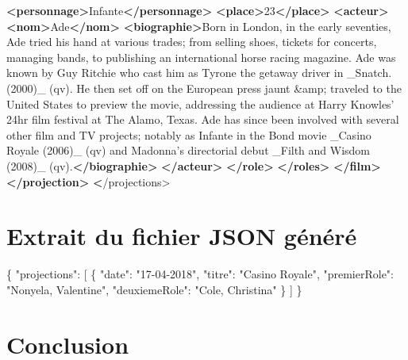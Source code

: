 \documentclass[]{article}
\newenvironment{Shaded}{}{}
\newcommand{\KeywordTok}[1]{\textcolor[rgb]{0.00,0.44,0.13}{\textbf{{#1}}}}
\newcommand{\DataTypeTok}[1]{\textcolor[rgb]{0.56,0.13,0.00}{{#1}}}
\newcommand{\DecValTok}[1]{\textcolor[rgb]{0.25,0.63,0.44}{{#1}}}
\newcommand{\StringTok}[1]{\textcolor[rgb]{0.25,0.44,0.63}{{#1}}}
\newcommand{\OtherTok}[1]{\textcolor[rgb]{0.00,0.44,0.13}{{#1}}}
\newcommand{\FunctionTok}[1]{\textcolor[rgb]{0.02,0.16,0.49}{{#1}}}
\newcommand{\ErrorTok}[1]{\textcolor[rgb]{1.00,0.00,0.00}{\textbf{{#1}}}}
\newcommand{\NormalTok}[1]{{#1}}
\begin{document}
\begin{Shaded}
\begin{Highlighting}[]
          \KeywordTok{<personnage>}\NormalTok{Infante}\KeywordTok{</personnage>}
          \KeywordTok{<place>}\NormalTok{23}\KeywordTok{</place>}
          \KeywordTok{<acteur>}
            \KeywordTok{<nom>}\NormalTok{Ade}\KeywordTok{</nom>}
            \KeywordTok{<biographie>}\NormalTok{Born in London, in the early seventies, Ade tried his hand at various trades;}
            {from selling shoes, tickets for concerts, managing bands, to publishing an}
            {international horse racing magazine. Ade was known by Guy Ritchie who cast him as}
            {Tyrone the getaway driver in _Snatch. (2000)_ (qv). He then set off on the European}
            {press jaunt }\DecValTok{&amp;} \NormalTok{traveled to the United States to preview}
            {the movie, addressing the audience at Harry Knowles' 24hr film festival at The Alamo,}
            {Texas.  Ade has since been involved with several other film and TV projects; notably}
            {as Infante in the Bond movie _Casino Royale (2006)_ (qv) and Madonna's directorial}
            {debut _Filth and Wisdom (2008)_ (qv).}\KeywordTok{</biographie>}
          \KeywordTok{</acteur>}
        \KeywordTok{</role>}
      \KeywordTok{</roles>}
    \KeywordTok{</film>}
  \KeywordTok{</projection>}
\ErrorTok{<}\NormalTok{/projections>}
\end{Highlighting}
\end{Shaded}

\section{Extrait du fichier JSON généré}\label{header-n134}

\begin{Shaded}
\begin{Highlighting}[]
\FunctionTok{\{}
  \DataTypeTok{"projections"}\FunctionTok{:} \OtherTok{[}
    \FunctionTok{\{}
      \DataTypeTok{"date"}\FunctionTok{:} \StringTok{"17-04-2018"}\FunctionTok{,}
      \DataTypeTok{"titre"}\FunctionTok{:} \StringTok{"Casino Royale"}\FunctionTok{,}
      \DataTypeTok{"premierRole"}\FunctionTok{:} \StringTok{"Nonyela, Valentine"}\FunctionTok{,}
      \DataTypeTok{"deuxiemeRole"}\FunctionTok{:} \StringTok{"Cole, Christina"}
    \FunctionTok{\}}
  \OtherTok{]}
\FunctionTok{\}}
\end{Highlighting}
\end{Shaded}

\newpage
\section{Conclusion}\label{header-n162}
\end{document}
